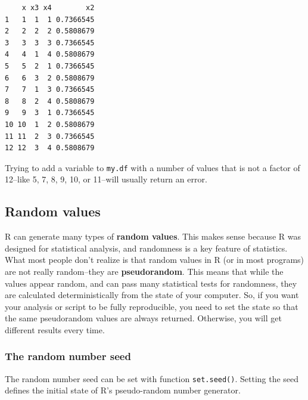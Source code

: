 \documentclass[
  13,
  letterpaper,
]{report}
\newenvironment{Shaded}{\begin{snugshade}}{\end{snugshade}}
\newcommand{\CommentTok}[1]{\textcolor[rgb]{0.37,0.37,0.37}{#1}}
\newcommand{\DecValTok}[1]{\textcolor[rgb]{0.68,0.00,0.00}{#1}}
\newcommand{\NormalTok}[1]{\textcolor[rgb]{0.00,0.23,0.31}{#1}}
\newcommand{\OtherTok}[1]{\textcolor[rgb]{0.00,0.23,0.31}{#1}}
\newcommand{\SpecialCharTok}[1]{\textcolor[rgb]{0.37,0.37,0.37}{#1}}
\begin{document}
\begin{verbatim}
    x x3 x4        x2
1   1  1  1 0.7366545
2   2  2  2 0.5808679
3   3  3  3 0.7366545
4   4  1  4 0.5808679
5   5  2  1 0.7366545
6   6  3  2 0.5808679
7   7  1  3 0.7366545
8   8  2  4 0.5808679
9   9  3  1 0.7366545
10 10  1  2 0.5808679
11 11  2  3 0.7366545
12 12  3  4 0.5808679
\end{verbatim}

Trying to add a variable to \texttt{my.df} with a number of values that
is not a factor of 12--like 5, 7, 8, 9, 10, or 11--will usually return
an error.

\begin{Shaded}
\end{Shaded}

\subsection{Random values}\label{sec-manip-make-rand}

R can generate many types of \textbf{random values}. This makes sense
because R was designed for statistical analysis, and randomness is a key
feature of statistics. What most people don't realize is that random
values in R (or in most programs) are not really random--they are
\textbf{pseudorandom}. This means that while the values appear random,
and can pass many statistical tests for randomness, they are calculated
deterministically from the state of your computer. So, if you want your
analysis or script to be fully reproducible, you need to set the state
so that the same pseudorandom values are always returned. Otherwise, you
will get different results every time.

\subsubsection{The random number seed}\label{sec-manip-make-rand-seed}

The random number seed can be set with function \texttt{set.seed()}.
Setting the seed defines the initial state of R's pseudo-random number
generator.
\end{document}
